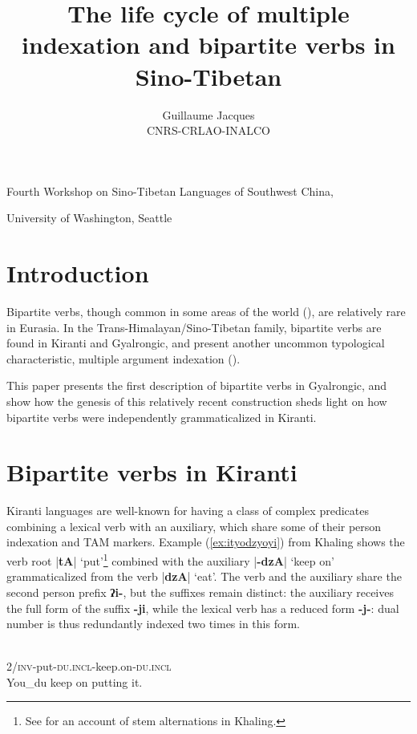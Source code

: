 \documentclass[oldfontcommands,oneside,a4paper,11pt]{article}
\newcommand{\ipa}[1]{{\phon\textbf{#1}}}
\newcommand{\dhatu}[2]{|\ipa{#1}| `#2'}
\begin{document}
 
\title{The life cycle of multiple indexation and bipartite verbs in Sino-Tibetan}
\author{Guillaume Jacques\\ CNRS-CRLAO-INALCO}
\maketitle

Fourth Workshop on Sino-Tibetan Languages of Southwest China, 

University of Washington, Seattle

 \section*{Introduction}
Bipartite verbs, though common in some areas of the world (\citealt{delancey96bipartite}), are relatively rare in Eurasia. In the Trans-Himalayan/Sino-Tibetan family, bipartite verbs are found in Kiranti and Gyalrongic, and present another uncommon typological characteristic, 
multiple argument indexation (\citealt{denk15multiple}).

This paper presents the first description of bipartite verbs in Gyalrongic, and show how the genesis of this relatively recent construction sheds light on how bipartite verbs were independently grammaticalized in Kiranti.

\section{Bipartite verbs in Kiranti}
Kiranti languages are well-known for having a class of complex predicates combining a lexical verb with an auxiliary, which share some of their person indexation and TAM markers. Example (\ref{ex:ityodzyoyi}) from Khaling shows the verb root \dhatu{tA}{put}\footnote{See \citet{jacques12khaling} for an account of stem alternations in Khaling.} combined with the auxiliary \dhatu{-dzA}{keep on} grammaticalized from the verb \dhatu{dzA}{eat}. The verb and the auxiliary share the second person prefix \ipa{ʔi-}, but the suffixes remain distinct: the auxiliary receives the full form of the suffix \ipa{-ji}, while the lexical verb has a reduced form \ipa{-j-}: dual number is thus redundantly indexed two times in this form.

\begin{exe}
\ex \label{ex:ityodzyoyi}
\gll \ipa{ʔi-tɵ-j-dzɵ-ji}\\
2/\textsc{inv}-put-\textsc{du.incl}-keep.on-\textsc{du.incl} \\
\glt You_{du} keep on putting it.
\end{exe}
\end{document}
